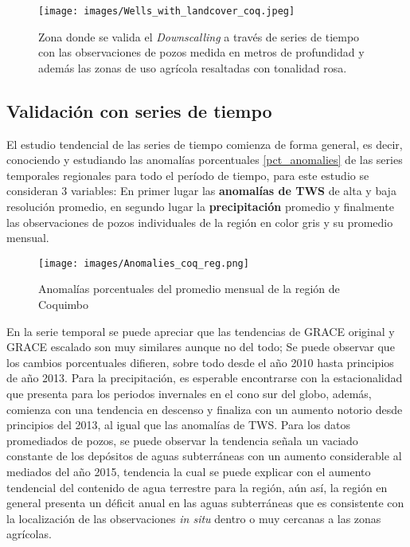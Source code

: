\begin{figure}[H]
    \centering
          \texttt{[image: images/Wells\_with\_landcover\_coq.jpeg]}
          \vskip -0.1in
    \caption[Zona de validación con series de tiempo]{\footnotesize Zona donde se valida el \textit{Downscalling} a través de series de tiempo con las observaciones de pozos medida en metros de profundidad y además las zonas de uso agrícola resaltadas con tonalidad rosa.}
    \label{szcoq}
\end{figure}

\subsection{Validación con series de tiempo}
El estudio tendencial de las series de tiempo comienza de forma general, es decir, conociendo y estudiando las anomalías porcentuales \ref{pct_anomalies} de las series temporales regionales para todo el período de tiempo, para este estudio se consideran 3 variables: En primer lugar las \textbf{anomalías de TWS} de alta y baja resolución promedio, en segundo lugar la 
\textbf{precipitación} promedio y finalmente las observaciones de pozos individuales de la región en color gris y su promedio mensual.

\begin{figure}[H]
    \centering
          \texttt{[image: images/Anomalies\_coq\_reg.png]}
          \vskip -0.1in
    \caption[Series de tiempo para la región de Coquimbo]{\footnotesize Anomalías porcentuales del promedio mensual de la región de Coquimbo}
    \label{tscoq}
\end{figure}
En la serie temporal se puede apreciar que las tendencias de GRACE original y GRACE escalado son muy similares aunque no del todo; Se puede observar que los cambios porcentuales difieren, sobre todo desde el año 2010 hasta principios de año 2013. Para la precipitación,
es esperable encontrarse con la estacionalidad que presenta para los periodos invernales en el cono sur del globo, además, comienza con una tendencia en descenso y finaliza con un aumento notorio desde principios del 2013, al igual que las anomalías de TWS. Para los datos promediados de pozos, 
se puede observar la tendencia señala un vaciado constante de los depósitos de aguas subterráneas con un aumento considerable al mediados del año 2015, tendencia la cual se puede explicar con el aumento tendencial del contenido de 
agua terrestre para la región, aún así, la región en general presenta un déficit anual en las aguas subterráneas que es consistente con la localización de las observaciones \textit{in situ} dentro o muy cercanas a las zonas agrícolas. 

